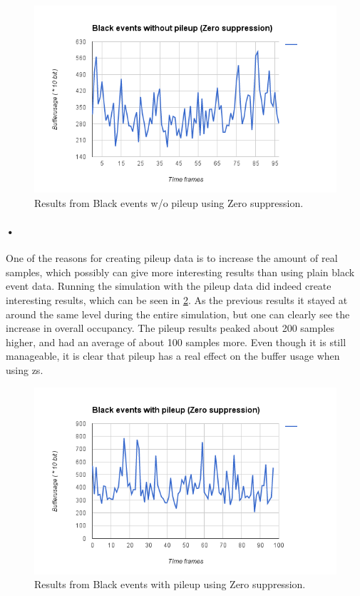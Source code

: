 \documentclass[a4paper, 12pt]{report}
\begin{document}
\begin{figure}[h!]
	\centering
		\includegraphics[width=1.0\textwidth]{images/blackevents-zs.png}
		\caption{Results from Black events w/o pileup using Zero suppression.}
		\label{fig:blackevents-zs}
\end{figure}

\paragraph{•}
One of the reasons for creating pileup data is to increase the amount of real samples, which possibly can give more interesting results than using plain black event data.
Running the simulation with the pileup data did indeed create interesting results, which can be seen in \ref{fig:blackevents-pileup-zs}.
As the previous results it stayed at around the same level during the entire simulation, but one can clearly see the increase in overall occupancy.
The pileup results peaked about 200 samples higher, and had an average of about 100 samples more.
Even though it is still manageable, it is clear that pileup has a real effect on the buffer usage when using \gls{zs}.

\begin{figure}[h!]
	\centering
		\includegraphics[width=1.0\textwidth]{images/blackevents-pileup-zs.png}
		\caption{Results from Black events with pileup using Zero suppression.}
		\label{fig:blackevents-pileup-zs}
\end{figure}
\end{document}
